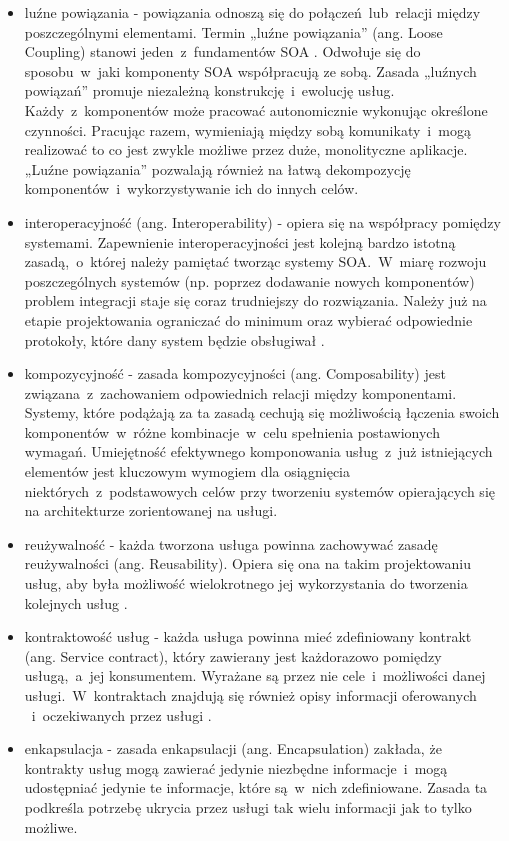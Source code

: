\begin{itemize}
\item{luźne powiązania - powiązania odnoszą się do połączeń~lub~relacji między poszczególnymi elementami. Termin „luźne powiązania” (ang. Loose Coupling) stanowi jeden~z~fundamentów SOA \cite{SOAsdj102009}. Odwołuje się do sposobu~w~jaki komponenty SOA współpracują ze sobą.  Zasada „luźnych powiązań” promuje niezależną konstrukcję~i~ewolucję usług. Każdy~z~komponentów może pracować autonomicznie wykonując określone czynności. Pracując razem, wymieniają między sobą komunikaty~i~mogą realizować to co jest zwykle możliwe przez duże, monolityczne aplikacje. „Luźne powiązania” pozwalają również na łatwą dekompozycję komponentów~i~wykorzystywanie ich do innych celów.}
\item{interoperacyjność (ang. Interoperability) - opiera się na współpracy pomiędzy systemami. Zapewnienie interoperacyjności jest kolejną bardzo istotną zasadą,~o~której należy pamiętać tworząc systemy SOA.~W~miarę rozwoju poszczególnych systemów (np. poprzez dodawanie nowych komponentów) problem integracji staje się coraz trudniejszy do rozwiązania. Należy już na etapie projektowania ograniczać do minimum oraz wybierać odpowiednie protokoły, które dany system będzie obsługiwał \cite{SOAsdj102009}.}
\item{kompozycyjność - zasada kompozycyjności (ang. Composability) jest związana~z~zachowaniem odpowiednich relacji między komponentami. Systemy, które podążają za ta zasadą cechują się możliwością łączenia swoich komponentów~w~różne kombinacje~w~celu spełnienia postawionych wymagań. Umiejętność efektywnego komponowania usług~z~już istniejących elementów jest kluczowym wymogiem dla osiągnięcia niektórych~z~podstawowych celów przy tworzeniu systemów opierających się na architekturze zorientowanej na usługi.}
\item{reużywalność - każda tworzona usługa powinna zachowywać zasadę reużywalności (ang. Reusability).  Opiera się ona na takim projektowaniu usług, aby była możliwość wielokrotnego jej wykorzystania do tworzenia kolejnych usług \cite{SOAsdj102009}.}
\item{kontraktowość usług - każda usługa powinna mieć zdefiniowany kontrakt (ang. Service contract), który zawierany jest każdorazowo pomiędzy usługą,~a~jej konsumentem. Wyrażane są przez nie cele~i~możliwości danej usługi.~W~kontraktach znajdują się również opisy informacji oferowanych ~i~oczekiwanych przez usługi \cite{SOAinfoq10}.}
\item{enkapsulacja - zasada enkapsulacji (ang. Encapsulation) zakłada, że kontrakty usług mogą zawierać jedynie niezbędne informacje~i~mogą udostępniać jedynie te informacje, które są~w~nich zdefiniowane. Zasada ta podkreśla potrzebę ukrycia przez usługi tak wielu informacji jak to tylko możliwe.}

\end{itemize}
